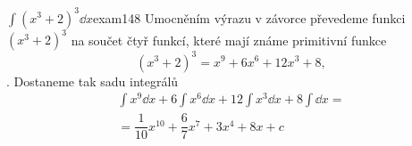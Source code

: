 \begin{mathexam}{\(\int(x^3+2)^3\dd{x}\)}{exam148} 
  Umocněním výrazu v závorce převedeme funkci \((x^3+2)^3\) na součet čtyř funkcí, které mají
  známe primitivní funkce \[(x^3+2)^3 = x^9+6x^6+12x^3+8,\]. Dostaneme tak sadu integrálů
  \begin{multline*}
    \int x^9\dd{x} + 6\int x^6\dd{x} + 12\int x^3\dd{x} + 8\int\dd{x} =     \\
      = \dfrac{1}{10}x^{10} + \dfrac{6}{7}x^{7} + 3x^4 + 8x + c  
  \end{multline*}
\end{mathexam}
